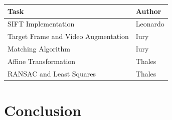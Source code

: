 \documentclass[]{IEEEtran}
\begin{document}
\begin{table}[H]
\begin{tabular}{|l|l|}
\hline
\textbf{Task}                       & \textbf{Author} \\ \hline
SIFT Implementation                 & Leonardo      \\ \hline
Target Frame and Video Augmentation & Iury          \\ \hline
Matching Algorithm                  & Iury          \\ \hline
Affine Transformation               & Thales        \\ \hline
RANSAC and Least Squares            & Thales        \\ \hline
\end{tabular}
\end{table}

\section{Conclusion}
 
  
\end{document}
